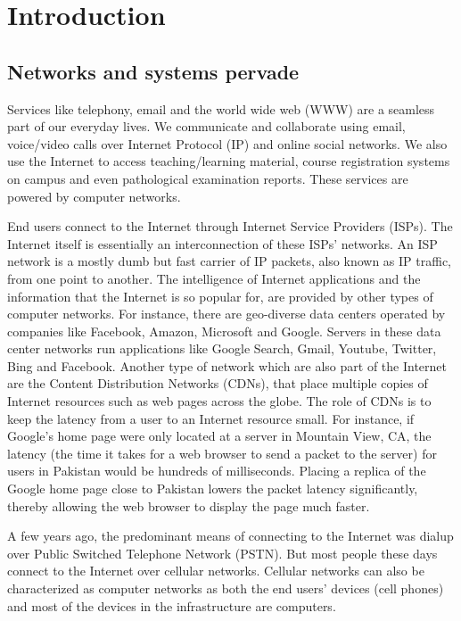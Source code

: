 \chapter{Introduction}
\label{chap:intro}

\section{Networks and systems pervade}
Services like telephony, email and the world wide web (WWW) are a seamless part of our everyday lives. We communicate and collaborate using email, voice/video calls over Internet Protocol (IP) and online social networks. We also use the Internet to access teaching/learning material, course registration systems on campus and even pathological examination reports. These services are powered by computer networks. 

End users connect to the Internet through Internet Service Providers (ISPs). The Internet itself is essentially an interconnection of these ISPs' networks. An ISP network is a mostly dumb but fast carrier of IP packets, also known as IP traffic, from one point to another. The intelligence of Internet applications and the information that the Internet is so popular for, are provided by other types of computer networks. For instance, there are geo-diverse data centers operated by companies like Facebook, Amazon, Microsoft and Google. Servers in these data center networks run applications like Google Search, Gmail, Youtube, Twitter, Bing and Facebook. Another type of network which are also part of the Internet are the Content Distribution Networks (CDNs), that place multiple copies of Internet resources such as web pages across the globe. The role of CDNs is to keep the latency from a user to an Internet resource small. For instance, if Google's home page were only located at a server in Mountain View, CA, the latency (the time it takes for a web browser to send a packet to the server) for users in Pakistan would be hundreds of milliseconds. Placing a replica of the Google home page close to Pakistan lowers the packet latency significantly, thereby allowing the web browser to display the page much faster.

A few years ago, the predominant means of connecting to the Internet was dialup over Public Switched Telephone Network (PSTN). But most people these days connect to the Internet over cellular networks. Cellular networks can also be characterized as computer networks as both the end users' devices (cell phones) and most of the devices in the infrastructure are computers. 

